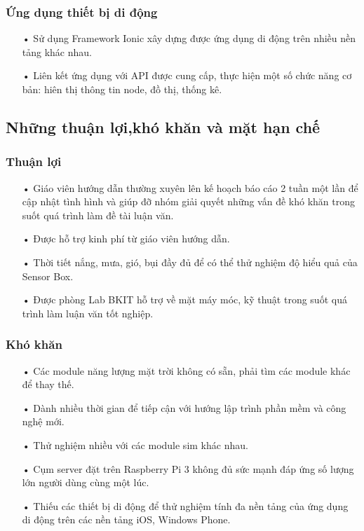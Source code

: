 \subsubsection*{Ứng dụng thiết bị di động}
\begin{itemize}
\item[•] Sử dụng Framework Ionic xây dựng được ứng dụng di động trên nhiều nền tảng khác nhau.
\item[•] Liên kết ứng dụng với API được cung cấp, thực hiện một số chức năng cơ bản: hiên thị thông tin node, đồ thị, thống kê.
\end{itemize}

\subsection{Những thuận lợi,khó khăn và mặt hạn chế}
\subsubsection*{Thuận lợi}
\begin{itemize}
\item[•] Giáo viên hướng dẫn thường xuyên lên kế hoạch báo cáo 2 tuần một lần để cập nhật tình hình và giúp đỡ nhóm giải quyết những vấn đề khó khăn trong suốt quá trình làm đề tài luận văn.
\item[•] Được hỗ trợ kinh phí từ giáo viên hướng dẫn.
\item[•] Thời tiết nắng, mưa, gió, bụi đầy đủ để có thể thử nghiệm độ hiểu quả của Sensor Box.
\item[•] Được phòng Lab BKIT hỗ trợ về mặt máy móc, kỹ thuật trong suốt quá trình làm luận văn tốt nghiệp.
\end{itemize}

\subsubsection*{Khó khăn}
\begin{itemize}
\item[•] Các module năng lượng mặt trời không có sẵn, phải tìm các module khác để thay thế.
\item[•] Dành nhiều thời gian để tiếp cận với hướng lập trình phần mềm và công nghệ mới.
\item[•] Thử nghiệm nhiều với các module sim khác nhau.
\item[•] Cụm server đặt trên Raspberry Pi 3 không đủ sức mạnh đáp ứng số lượng lớn người dùng cùng một lúc.
\item[•] Thiếu các thiết bị di động để thử nghiệm tính đa nền tảng của ứng dụng di động trên các nền tảng iOS, Windows Phone.
\end{itemize}
